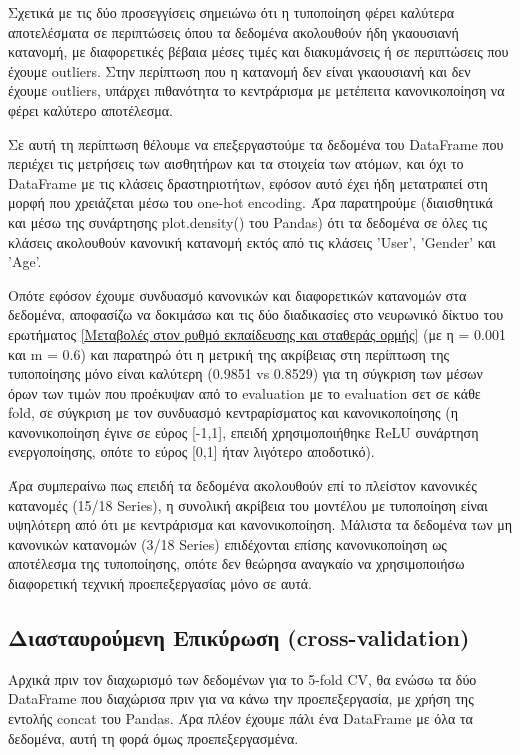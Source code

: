 \documentclass[12pt,a4paper]{article}
\begin{document}
Σχετικά με τις δύο προσεγγίσεις σημειώνω ότι η τυποποίηση φέρει καλύτερα αποτελέσματα σε περιπτώσεις όπου τα δεδομένα ακολουθούν ήδη γκαουσιανή κατανομή, με διαφορετικές βέβαια μέσες τιμές και διακυμάνσεις ή σε περιπτώσεις που έχουμε outliers. Στην περίπτωση που η κατανομή δεν είναι γκαουσιανή και δεν έχουμε outliers, υπάρχει πιθανότητα το κεντράρισμα με μετέπειτα κανονικοποίηση να φέρει καλύτερο αποτέλεσμα.

Σε αυτή τη περίπτωση θέλουμε να επεξεργαστούμε τα δεδομένα του DataFrame που περιέχει τις μετρήσεις των αισθητήρων και τα στοιχεία των ατόμων, και όχι το DataFrame με τις κλάσεις δραστηριοτήτων, εφόσον αυτό έχει ήδη μετατραπεί στη μορφή που χρειάζεται μέσω του one-hot encoding. Άρα παρατηρούμε (διαισθητικά και μέσω της συνάρτησης plot.density() του Pandas) ότι τα δεδομένα σε όλες τις κλάσεις ακολουθούν κανονική κατανομή εκτός από τις κλάσεις 'User', 'Gender' και 'Age'.

Οπότε εφόσον έχουμε συνδυασμό κανονικών και διαφορετικών κατανομών στα δεδομένα, αποφασίζω να δοκιμάσω και τις δύο διαδικασίες στο νευρωνικό δίκτυο του ερωτήματος \ref{Μεταβολές στον ρυθμό εκπαίδευσης και σταθεράς ορμής} (με η = 0.001 και m = 0.6) και παρατηρώ ότι η μετρική της ακρίβειας στη περίπτωση της τυποποίησης μόνο είναι καλύτερη (0.9851 vs 0.8529) για τη σύγκριση των μέσων όρων των τιμών που προέκυψαν από το evaluation με το evaluation σετ σε κάθε fold, σε σύγκριση με τον συνδυασμό κεντραρίσματος και κανονικοποίησης (η κανονικοποίηση έγινε σε εύρος [-1,1], επειδή χρησιμοποιήθηκε ReLU συνάρτηση ενεργοποίησης, οπότε το εύρος [0,1] ήταν λιγότερο αποδοτικό).

Άρα συμπεραίνω πως επειδή τα δεδομένα ακολουθούν επί το πλείστον κανονικές κατανομές (15/18 Series), η συνολική ακρίβεια του μοντέλου με τυποποίηση είναι υψηλότερη από ότι με κεντράρισμα και κανονικοποίηση. Μάλιστα τα δεδομένα των μη κανονικών κατανομών (3/18 Series) επιδέχονται επίσης κανονικοποίηση ως αποτέλεσμα της τυποποίησης, οπότε δεν θεώρησα αναγκαίο να χρησιμοποιήσω διαφορετική τεχνική προεπεξεργασίας μόνο σε αυτά. 

\subsection{Διασταυρούμενη Επικύρωση (cross-validation)}

Αρχικά πριν τον διαχωρισμό των δεδομένων για το 5-fold CV, θα ενώσω τα δύο DataFrame που διαχώρισα πριν για να κάνω την προεπεξεργασία, με χρήση της εντολής concat του Pandas. Άρα πλέον έχουμε πάλι ένα DataFrame με όλα τα δεδομένα, αυτή τη φορά όμως προεπεξεργασμένα.
\end{document}
